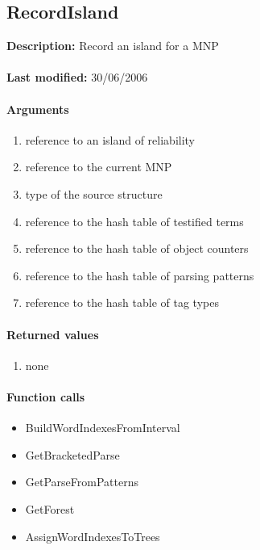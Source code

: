 \subsection{RecordIsland}
\textbf{Description:} Record an island for a MNP\\
\\\textbf{Last modified:} 30/06/2006

\paragraph{Arguments}
\begin{enumerate}
\item reference to an island of reliability
\item reference to the current MNP
\item type of the source structure
\item reference to the hash table of testified terms
\item reference to the hash table of object counters
\item reference to the hash table of parsing patterns
\item reference to the hash table of tag types
\end{enumerate}

\paragraph{Returned values}
\begin{enumerate}
\item none
\end{enumerate}

\paragraph{Function calls}
\begin{itemize}
\item BuildWordIndexesFromInterval
\item GetBracketedParse
\item GetParseFromPatterns
\item GetForest
\item AssignWordIndexesToTrees
\end{itemize}

